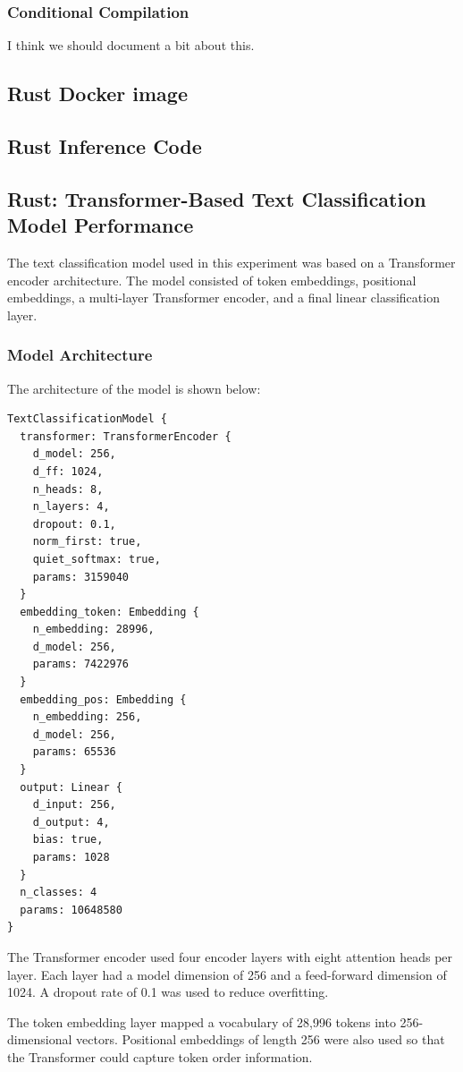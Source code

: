 \documentclass[10pt,a4paper,twocolumn]{article}
\begin{document}
\subsubsection{Conditional Compilation}
I think we should document a bit about this. 

\subsection{Rust Docker image}

\subsection{Rust Inference Code}

\subsection{Rust: Transformer-Based Text Classification Model Performance}

The text classification model used in this experiment was based on a Transformer encoder architecture. The model consisted of token embeddings, positional embeddings, a multi-layer Transformer encoder, and a final linear classification layer.

\subsubsection{Model Architecture}

The architecture of the model is shown below:

\begin{verbatim}
TextClassificationModel {
  transformer: TransformerEncoder {
    d_model: 256,
    d_ff: 1024,
    n_heads: 8,
    n_layers: 4,
    dropout: 0.1,
    norm_first: true,
    quiet_softmax: true,
    params: 3159040
  }
  embedding_token: Embedding {
    n_embedding: 28996,
    d_model: 256,
    params: 7422976
  }
  embedding_pos: Embedding {
    n_embedding: 256,
    d_model: 256,
    params: 65536
  }
  output: Linear {
    d_input: 256,
    d_output: 4,
    bias: true,
    params: 1028
  }
  n_classes: 4
  params: 10648580
}
\end{verbatim}

The Transformer encoder used four encoder layers with eight attention heads per layer. Each layer had a model dimension of 256 and a feed-forward dimension of 1024. A dropout rate of 0.1 was used to reduce overfitting.

The token embedding layer mapped a vocabulary of 28,996 tokens into 256-dimensional vectors. Positional embeddings of length 256 were also used so that the Transformer could capture token order information.
\end{document}

